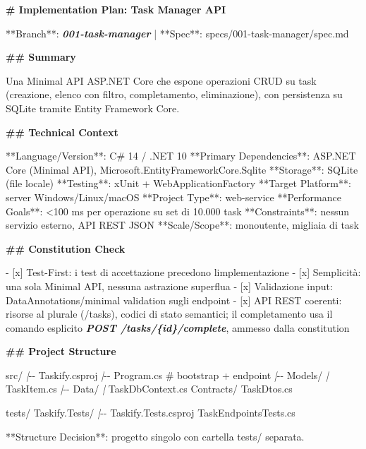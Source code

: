 \documentclass[
  italian,
  10pt,
]{book}
\newenvironment{Shaded}{\begin{snugshade}}{\end{snugshade}}
\newcommand{\FunctionTok}[1]{\textcolor[rgb]{0.13,0.29,0.53}{\textbf{#1}}}
\newcommand{\InformationTok}[1]{\textcolor[rgb]{0.56,0.35,0.01}{\textbf{\textit{#1}}}}
\newcommand{\NormalTok}[1]{#1}
\newcommand{\PreprocessorTok}[1]{\textcolor[rgb]{0.56,0.35,0.01}{\textit{#1}}}
\newcommand{\SpecialStringTok}[1]{\textcolor[rgb]{0.31,0.60,0.02}{#1}}
\newcommand{\VariableTok}[1]{\textcolor[rgb]{0.00,0.00,0.00}{#1}}
\begin{document}
\begin{Shaded}
\begin{Highlighting}[]
\FunctionTok{\# Implementation Plan: Task Manager API}

\NormalTok{**Branch**: }\InformationTok{\textasciigrave{}001{-}task{-}manager\textasciigrave{}}\NormalTok{ | **Spec**: specs/001{-}task{-}manager/spec.md}

\FunctionTok{\#\# Summary}

\NormalTok{Una Minimal API ASP.NET Core che espone operazioni CRUD su task}
\NormalTok{(creazione, elenco con filtro, completamento, eliminazione), con}
\NormalTok{persistenza su SQLite tramite Entity Framework Core.}

\FunctionTok{\#\# Technical Context}

\NormalTok{**Language/Version**: C\# 14 / .NET 10}
\NormalTok{**Primary Dependencies**: ASP.NET Core (Minimal API),}
\NormalTok{  Microsoft.EntityFrameworkCore.Sqlite}
\NormalTok{**Storage**: SQLite (file locale)}
\NormalTok{**Testing**: xUnit + WebApplicationFactory}
\NormalTok{**Target Platform**: server Windows/Linux/macOS}
\NormalTok{**Project Type**: web{-}service}
\NormalTok{**Performance Goals**: \textless{}100 ms per operazione su set di 10.000 task}
\NormalTok{**Constraints**: nessun servizio esterno, API REST JSON}
\NormalTok{**Scale/Scope**: monoutente, migliaia di task}

\FunctionTok{\#\# Constitution Check}

\SpecialStringTok{{-} }\VariableTok{[x]}\NormalTok{ Test{-}First: i test di accettazione precedono l\textquotesingle{}implementazione}
\SpecialStringTok{{-} }\VariableTok{[x]}\NormalTok{ Semplicità: una sola Minimal API, nessuna astrazione superflua}
\SpecialStringTok{{-} }\VariableTok{[x]}\NormalTok{ Validazione input: DataAnnotations/minimal validation sugli endpoint}
\SpecialStringTok{{-} }\VariableTok{[x]}\NormalTok{ API REST coerenti: risorse al plurale (/tasks), codici di stato semantici; il completamento usa il comando esplicito }\InformationTok{\textasciigrave{}POST /tasks/\{id\}/complete\textasciigrave{}}\NormalTok{, ammesso dalla constitution}

\FunctionTok{\#\# Project Structure}

\NormalTok{src/}
\PreprocessorTok{|}\NormalTok{{-}{-} Taskify.csproj}
\PreprocessorTok{|}\NormalTok{{-}{-} Program.cs            \# bootstrap + endpoint}
\PreprocessorTok{|}\NormalTok{{-}{-} Models/}
\PreprocessorTok{|}\NormalTok{   \textasciigrave{}{-}{-} TaskItem.cs}
\PreprocessorTok{|}\NormalTok{{-}{-} Data/}
\PreprocessorTok{|}\NormalTok{   \textasciigrave{}{-}{-} TaskDbContext.cs}
\NormalTok{\textasciigrave{}{-}{-} Contracts/}
\NormalTok{    \textasciigrave{}{-}{-} TaskDtos.cs}

\NormalTok{tests/}
\NormalTok{\textasciigrave{}{-}{-} Taskify.Tests/}
    \PreprocessorTok{|}\NormalTok{{-}{-} Taskify.Tests.csproj}
\NormalTok{    \textasciigrave{}{-}{-} TaskEndpointsTests.cs}

\NormalTok{**Structure Decision**: progetto singolo con cartella tests/ separata.}
\end{Highlighting}
\end{Shaded}
\end{document}
